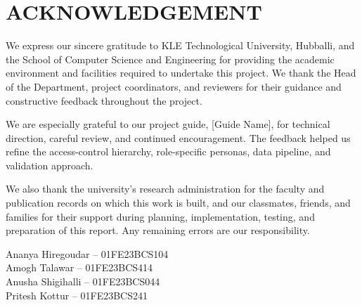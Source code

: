 \chapter*{ACKNOWLEDGEMENT}

We express our sincere gratitude to KLE Technological University, Hubballi, and the School of Computer Science and Engineering for providing the academic environment and facilities required to undertake this project. We thank the Head of the Department, project coordinators, and reviewers for their guidance and constructive feedback throughout the project.

We are especially grateful to our project guide, [Guide Name], for technical direction, careful review, and continued encouragement. The feedback helped us refine the access-control hierarchy, role-specific personas, data pipeline, and validation approach.

We also thank the university's research administration for the faculty and publication records on which this work is built, and our classmates, friends, and families for their support during planning, implementation, testing, and preparation of this report. Any remaining errors are our responsibility.

\begin{flushright}
\vspace{1cm}
Ananya Hiregoudar -- 01FE23BCS104\\
Amogh Talawar -- 01FE23BCS414\\
Anusha Shigihalli -- 01FE23BCS044\\
Pritesh Kottur -- 01FE23BCS241
\end{flushright}
